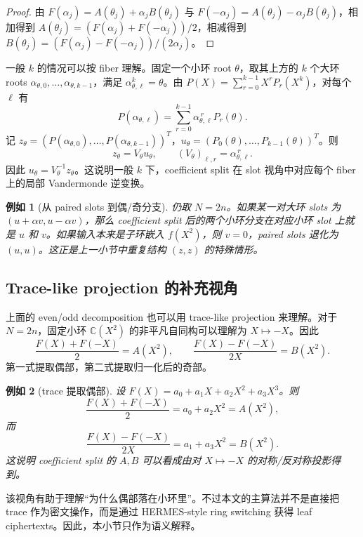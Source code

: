 \documentclass[UTF8,11pt]{article}
\theoremstyle{definition}
\theoremstyle{plain}
\newtheorem{example}{例如}
\begin{document}
\begin{proof}
由 \(F(\alpha_j)=A(\theta_j)+\alpha_jB(\theta_j)\) 与 \(F(-\alpha_j)=A(\theta_j)-\alpha_jB(\theta_j)\)，相加得到 \(A(\theta_j)=(F(\alpha_j)+F(-\alpha_j))/2\)，相减得到 \(B(\theta_j)=(F(\alpha_j)-F(-\alpha_j))/(2\alpha_j)\)。
\end{proof}

一般 \(k\) 的情况可以按 fiber 理解。固定一个小环 root \(\theta\)，取其上方的 \(k\) 个大环 roots \(\alpha_{\theta,0},\ldots,\alpha_{\theta,k-1}\)，满足 \(\alpha_{\theta,\ell}^k=\theta\)。由 \(P(X)=\sum_{r=0}^{k-1}X^rP_r(X^k)\)，对每个 \(\ell\) 有
\[
P(\alpha_{\theta,\ell})=\sum_{r=0}^{k-1}\alpha_{\theta,\ell}^{\,r}P_r(\theta).
\]
记 \(z_\theta=(P(\alpha_{\theta,0}),\ldots,P(\alpha_{\theta,k-1}))^T\)，\(u_\theta=(P_0(\theta),\ldots,P_{k-1}(\theta))^T\)。则
\[
z_\theta=V_\theta u_\theta,
\qquad
(V_\theta)_{\ell,r}=\alpha_{\theta,\ell}^{\,r}.
\]
因此 \(u_\theta=V_\theta^{-1}z_\theta\)。这说明一般 \(k\) 下，coefficient split 在 slot 视角中对应每个 fiber 上的局部 Vandermonde 逆变换。

\begin{example}[从 paired slots 到偶/奇分支]
仍取 \(N=2n\)。如果某一对大环 slots 为 \((u+\alpha v,u-\alpha v)\)，那么 coefficient split 后的两个小环分支在对应小环 slot 上就是 \(u\) 和 \(v\)。如果输入本来是子环嵌入 \(f(X^2)\)，则 \(v=0\)，paired slots 退化为 \((u,u)\)。这正是上一小节中重复结构 \((z,z)\) 的特殊情形。
\end{example}

\subsection{Trace-like projection 的补充视角}
\label{subsec:trace-like-projection}

上面的 even/odd decomposition 也可以用 trace-like projection 来理解。对于 \(N=2n\)，固定小环 \(\mathbb C(X^2)\) 的非平凡自同构可以理解为 \(X\mapsto -X\)。因此
\[
\frac{F(X)+F(-X)}{2}=A(X^2),
\qquad
\frac{F(X)-F(-X)}{2X}=B(X^2).
\]
第一式提取偶部，第二式提取归一化后的奇部。

\begin{example}[trace 提取偶部]
设 \(F(X)=a_0+a_1X+a_2X^2+a_3X^3\)。则
\[
\frac{F(X)+F(-X)}{2}=a_0+a_2X^2=A(X^2),
\]
而
\[
\frac{F(X)-F(-X)}{2X}=a_1+a_3X^2=B(X^2).
\]
这说明 coefficient split 的 \(A,B\) 可以看成由对 \(X\mapsto -X\) 的对称/反对称投影得到。
\end{example}

该视角有助于理解“为什么偶部落在小环里”。不过本文的主算法并不是直接把 trace 作为密文操作，而是通过 HERMES-style ring switching 获得 leaf ciphertexts。因此，本小节只作为语义解释。
\end{document}
